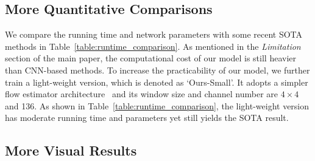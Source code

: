 \documentclass[10pt,twocolumn,letterpaper]{article}
\begin{document}
	\subsection{More Quantitative Comparisons}
	
	\begin{table}[h]
		\setlength{\belowcaptionskip}{0pt}
		\centering
		\footnotesize
\caption{More quantitative comparisons. The running time is tested on images with $448\times 256$ resolution on an NVIDIA TITAN V GPU.}
		\label{table:runtime_comparison}
\end{table}
	
	We compare the running time and network parameters with some recent SOTA methods in Table~\ref{table:runtime_comparison}.
	As mentioned in the \textit{Limitation} section of the main paper, the computational cost of our model is still heavier than CNN-based methods. To increase the practicability of our model, we further train a light-weight version, which is denoted as `Ours-Small'. It adopts a simpler flow estimator architecture~\cite{rife} and its window size and channel number are $4\times 4$ and 136. As shown in Table~\ref{table:runtime_comparison}, the light-weight version has moderate running time and parameters yet still yields the SOTA result.
	
	
	


	\subsection{More Visual Results}
	
\end{document}
